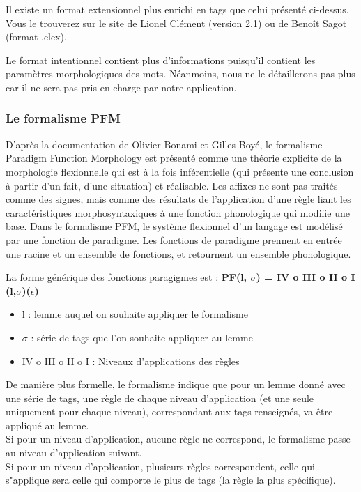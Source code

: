 \documentclass[12pt,a4paper]{article}
\begin{document}
Il existe un format extensionnel plus enrichi en tags que celui présenté ci-dessus. Vous le trouverez sur le site de Lionel Clément (version 2.1) ou de Benoît Sagot (format .elex).

Le format intentionnel contient plus d'informations puisqu'il contient les paramètres morphologiques des mots.
Néanmoins, nous ne le détaillerons pas plus car il ne sera pas pris en charge par notre application.

\subsubsection{Le formalisme PFM}

D'après la documentation \cite{Formalisme} de Olivier Bonami et Gilles Boyé, le formalisme Paradigm Function Morphology est présenté comme une théorie explicite de la morphologie flexionnelle qui est à la fois inférentielle (qui présente une conclusion à partir d'un fait, d'une situation) et réalisable. Les affixes ne sont pas traités comme des signes, mais comme des résultats de l'application d'une règle liant les caractéristiques morphosyntaxiques à une fonction phonologique qui modifie une base.
Dans le formalisme PFM, le système flexionnel d'un langage est modélisé par une fonction de paradigme.
Les fonctions de paradigme prennent en entrée une racine et un ensemble de fonctions, et retournent un ensemble phonologique.

La forme générique des fonctions paragigmes est : \textbf{PF(l, $\sigma$) = IV o III o II o I (l,$\sigma$)($\epsilon$)}
\begin{itemize}
    \item l : lemme auquel on souhaite appliquer le formalisme
    \item $\sigma$ : série de tags que l'on souhaite appliquer au lemme
    \item IV o III o II o I : Niveaux d'applications des règles
\end{itemize}

\smallbreak

De manière plus formelle, le formalisme indique que pour un lemme donné avec une série de tags, une règle de chaque niveau d'application (et une seule uniquement pour chaque niveau), correspondant aux tags renseignés, va être appliqué au lemme. \\
Si pour un niveau d'application, aucune règle ne correspond, le formalisme passe au niveau d'application suivant. \\
Si pour un niveau d'application, plusieurs règles correspondent, celle qui s"applique sera celle qui comporte le plus de tags (la règle la plus spécifique).
\end{document}
